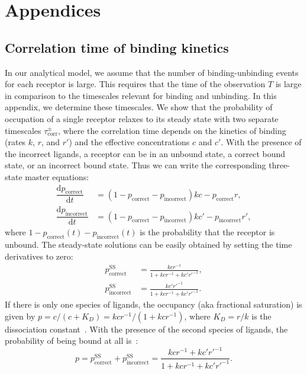 \section{Appendices}
\label{sec:ch5:appendices}

\subsection{Correlation time of binding kinetics}
\label{sec:ch5:corr-time}

In our analytical model, we assume that the number of binding-unbinding events for each receptor is large.
This requires that the time of the observation $T$ is large in comparison to the timescales relevant for binding and unbinding.
In this appendix, we determine these timescales.
We show that the probability of occupation of a single receptor relaxes to its steady state with two separate timescales $\tau_\textrm{corr}^\pm$, where the correlation time depends on the kinetics of binding (rates $k$, $r$, and $r'$) and the effective concentrations $c$ and $c'$.
With the presence of the incorrect ligands, a receptor can be in an unbound state, a correct bound state, or an incorrect bound state.
Thus we can write the corresponding three-state master equations:
\begin{align*}
    \dfrac{\mathrm{d} p_\text{correct}}{\mathrm{d} t}&=(1-p_\text{correct}-p_\text{incorrect})kc-p_\text{correct}r,\\
    \dfrac{\mathrm{d} p_\text{incorrect}}{\mathrm{d} t}&=(1-p_\text{correct}-p_\text{incorrect})kc'-p_\text{incorrect}r',
\end{align*}
where $1-p_\text{correct}(t)-p_\text{incorrect}(t)$ is the probability that the receptor is unbound.
The steady-state solutions can be easily obtained by setting the time derivatives to zero:
\begin{align}
    p_\textrm{correct}^{\textrm{SS}}&=\frac{kcr^{-1}}{1+kcr^{-1}+kc'r'^{-1}},\\
    p_\textrm{incorrect}^{\textrm{SS}}&=\frac{kc'r'^{-1}}{1+kcr^{-1}+kc'r'^{-1}}.
\end{align}
If there is only one species of ligands, the occupancy (aka fractional saturation) is given by $p=c/(c+K_D)=kcr^{-1}/(1+kcr^{-1})$, where $K_D=r/k$ is the dissociation constant~\cite{hu2010physical}.
With the presence of the second species of ligands, the probability of being bound at all is~\cite{mora2015physical}:
\begin{equation}\label{eq:ch5:occupancy}
p=p_\textrm{correct}^{\textrm{SS}}+p_\textrm{incorrect}^{\textrm{SS}}=\frac{kcr^{-1}+kc'r'^{-1}}{1+kcr^{-1}+kc'r'^{-1}}.
\end{equation}
